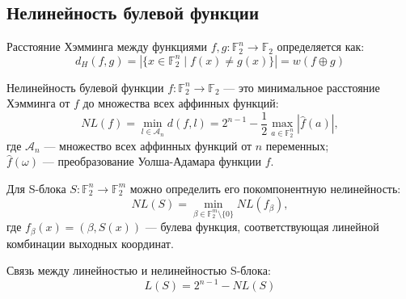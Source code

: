 \subsection{Нелинейность булевой функции}

\begin{definition}
Расстояние Хэмминга между функциями $f, g : \mathbb{F}_2^n \to \mathbb{F}_2$ определяется как:
\[
    d_H(f, g) = |\{x \in \mathbb{F}_2^n \mid f(x) \neq g(x)\}| = w(f \oplus g)
\]
\end{definition}

\begin{definition}
Нелинейность булевой функции $f : \mathbb{F}_2^n \to \mathbb{F}_2$ — это минимальное расстояние Хэмминга от $f$ до множества всех аффинных функций:
\[
    NL(f) = \min_{l \in \mathcal{A}_n} d(f, l) = 2^{n-1} - \frac{1}{2}\max_{a \in \mathbb{F}_2^n}|\widehat{f}(a)|,
\]
где $\mathcal{A}_n$ — множество всех аффинных функций от $n$ переменных; \\
\indent $\widehat{f}(\omega)$ — преобразование Уолша-Адамара функции $f$.
\end{definition}

Для S-блока $S : \mathbb{F}_2^n \to \mathbb{F}_2^m$ можно определить его покомпонентную нелинейность:
\[
    NL(S) = \min_{\beta \in \mathbb{F}_2^m \setminus \{0\}} NL(f_\beta),
\]
где $f_\beta(x) = (\beta, S(x))$ — булева функция, соответствующая линейной комбинации выходных координат.

\begin{theorem}
Связь между линейностью и нелинейностью S-блока:
\[
    L(S) = 2^{n-1} - NL(S)
\]
\end{theorem}

